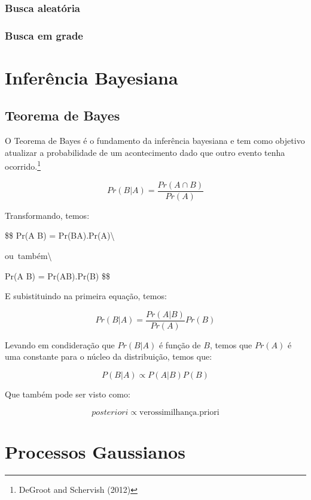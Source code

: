 \documentclass[
	12pt,				%
	a4paper,		%
	oneside,    %
	chapter=TITLE,		   %
	section=TITLE,		   %
	subsection=TITLE,	   %
	subsubsection=TITLE, %
	english,			%
	french,				%
	spanish,			%
	brazil,				%
]{abntex2}
\begin{document}
\hypertarget{busca-aleatuxf3ria}{%
\subsubsection{Busca aleatória}\label{busca-aleatuxf3ria}}

\hypertarget{busca-em-grade}{%
\subsubsection{Busca em grade}\label{busca-em-grade}}

\hypertarget{inferuxeancia-bayesiana}{%
\section{Inferência Bayesiana}\label{inferuxeancia-bayesiana}}

\hypertarget{teorema-de-bayes}{%
\subsection{Teorema de Bayes}\label{teorema-de-bayes}}

O Teorema de Bayes é o fundamento da inferência bayesiana e tem como
objetivo atualizar a probabilidade de um acontecimento dado que outro
evento tenha ocorrido.\footnote{DeGroot and Schervish (2012)}

\[
Pr(B|A) = \frac{Pr(A \cap B)}{Pr(A)}
\]

Transformando, temos:

\$\$ Pr(A \cap B) = Pr(B\textbar{}A).Pr(A)\textbackslash{}

\mbox{ou também}\textbackslash{}

Pr(A \cap B) = Pr(A\textbar{}B).Pr(B) \$\$

E subistituindo na primeira equação, temos:

\[
Pr(B|A) = \frac{Pr(A|B)}{Pr(A)}Pr(B)
\]

Levando em condideração que \(Pr(B|A)\) é função de \(B\), temos que
\(Pr(A)\) é uma constante para o núcleo da distribuição, temos que:

\[
P(B|A) \propto P(A|B)P(B)
\]

Que também pode ser visto como:

\[
posteriori \propto \mbox{verossimilhança}.\mbox{priori}
\]

\hypertarget{processos-gaussianos}{%
\section{Processos Gaussianos}\label{processos-gaussianos}}
\end{document}
